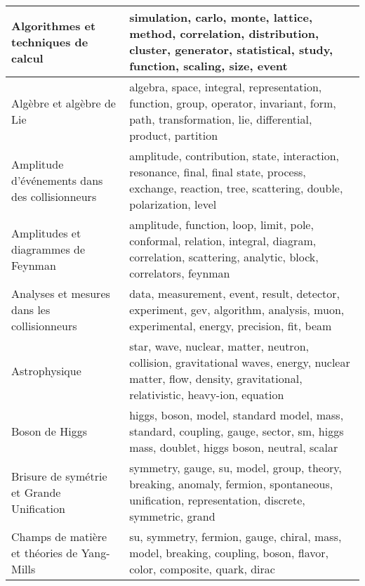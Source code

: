 \begin{longtable}[H]{p{}|p{}}
\bottomrule
\endlastfoot
Algorithmes et techniques de calcul                             &                                                               simulation, carlo, monte, lattice, method, correlation, distribution, cluster, generator, statistical, study, function, scaling, size, event \\ \midrule
Algèbre et algèbre de Lie                                       &                                                          algebra, space, integral, representation, function, group, operator, invariant, form, path, transformation, lie, differential, product, partition \\ \midrule
Amplitude d'événements dans des collisionneurs                  &                                                     amplitude, contribution, state, interaction, resonance, final, final state, process, exchange, reaction, tree, scattering, double, polarization, level \\ \midrule
Amplitudes et diagrammes de Feynman                             &                                                             amplitude, function, loop, limit, pole, conformal, relation, integral, diagram, correlation, scattering, analytic, block, correlators, feynman \\ \midrule
Analyses et mesures dans les collisionneurs                     &                                                                         data, measurement, event, result, detector, experiment, gev, algorithm, analysis, muon, experimental, energy, precision, fit, beam \\ \midrule
Astrophysique                                                   &                                              star, wave, nuclear, matter, neutron, collision, gravitational waves, energy, nuclear matter, flow, density, gravitational, relativistic, heavy-ion, equation \\ \midrule
Boson de Higgs                                                  &                                                                        higgs, boson, model, standard model, mass, standard, coupling, gauge, sector, sm, higgs mass, doublet, higgs boson, neutral, scalar \\ \midrule
Brisure de symétrie et Grande Unification                       &                                                                symmetry, gauge, su, model, group, theory, breaking, anomaly, fermion, spontaneous, unification, representation, discrete, symmetric, grand \\ \midrule
Champs de matière et théories de Yang-Mills                     &                                                                                       su, symmetry, fermion, gauge, chiral, mass, model, breaking, coupling, boson, flavor, color, composite, quark, dirac \\ \midrule

\end{longtable}
